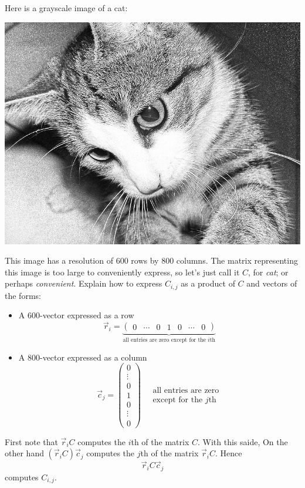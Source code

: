 \documentclass{ximera}
\begin{document}
\begin{example}[Grayscale Image]%
  Here is a grayscale image of a cat:
  \begin{image}
  \includegraphics[width=.5\textwidth]{catface.jpg}
  \end{image}
  This image has a resolution of $600$ rows by $800$ columns. The
  matrix representing this image is too large to conveniently express,
  so let's just call it $C$, for \textit{cat}; or perhaps \textit{convenient}.
  Explain how to express $C_{i,j}$ as a product of $C$ and vectors of
  the forms:
  \begin{itemize}
    \item A $600$-vector expressed as a row
      \[
      \vec r_i = \underbrace{\begin{pmatrix} 0 & \cdots  & 0 & 1 & 0 & \cdots & 0 \end{pmatrix}}_{\text{all entries are zero except for the $i$th}}
      \]
    \item A $800$-vector expressed as a column
      \[
      \vec c_j=\begin{pmatrix} 0 \\ \vdots  \\ 0 \\ 1 \\ 0 \\ \vdots \\ 0 \end{pmatrix}\quad \begin{matrix}
        \text{all entries are zero}\\
        \text{except for the $j$th}
      \end{matrix}
      \]
  \end{itemize}
  \begin{explanation}
    First note that $\vec r_i C$ computes the $i$th
     of the matrix
    $C$. With this saide, On the other hand $(\vec r_i C)\vec c_j$ computes the $j$th
     of the matrix
    $\vec r_i C$. Hence
    \[
    \vec r_i C\vec{c}_j
    \]
    computes $C_{i,j}$.
  \end{explanation}
\end{example}
\end{document}
